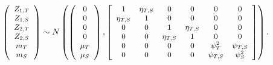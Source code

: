 \documentclass[aoas]{imsart}
\begin{document}
\begin{equation}
\small
\label{eq:22}
    \left(
    \begin{array}{cccccc}
         Z_{1,T} \\
         Z_{1,S} \\
         Z_{2,T} \\
         Z_{2,S} \\
         m_{T} \\
         m_{S}
    \end{array}
    \right)
\sim N \left(
\left(
    \begin{array}{cccccc}
    0 \\
    0 \\
    0 \\
    0 \\
          \mu_{T} \\
         \mu_{S} 
    \end{array}
    \right),
   \left[ 
      \begin{array}{cccccc}
        1 & \eta_{T,S} & 0 & 0 & 0 & 0  \\
        \eta_{T,S} & 1 & 0 & 0 & 0 & 0 \\
        0 & 0 & 1 & \eta_{T,S} & 0 & 0 \\
        0 & 0 & \eta_{T,S} & 1 & 0 & 0 \\
        0 & 0 & 0 & 0 & \psi^2_{T} & \psi_{T,S} \\
        0 & 0 & 0 & 0 & \psi_{T,S} & \psi^2_{S} 
    \end{array}
\right]
\right).
\vspace{0.2cm}
\end{equation}
\end{document}
